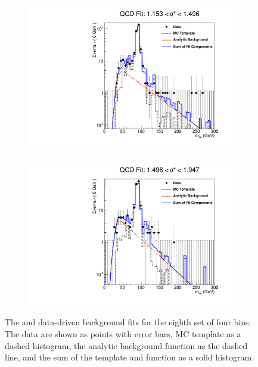 \begin{figure}[!htbp]
\begin{subfigure}[b]{\SideBySidePlotWidth}
        \includegraphics[width=\linewidth]{figures/qcd_fits/qcd_fit_plot_for_31.pdf}
        \caption{}
        \label{fig:qcd_fit_31}
    \end{subfigure}%
    \begin{subfigure}[b]{\SideBySidePlotWidth}
        \includegraphics[width=\linewidth]{figures/qcd_fits/qcd_fit_plot_for_32.pdf}
        \caption{}
        \label{fig:qcd_fit_32}
    \end{subfigure}
    \caption[
       The \QCDjets and \wjets data-driven background fits for the eighth set
       of four \phistar bins.
    ]{
       The \QCDjets and \wjets data-driven background fits for the eighth set
       of four \phistar bins. The data are shown as points with error bars, MC
       template as a dashed histogram, the analytic background function as the
       dashed line, and the sum of the template and function as a solid
       histogram.
    }
    \label{fig:qcd_many_8}
\end{figure}

